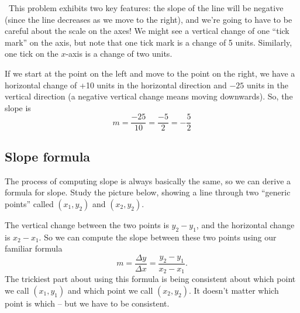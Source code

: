 \begin{boxex}
\exsoln\ This problem exhibits two key features: the slope of the line will be negative (since the line decreases as we move to the right), and we're going to have to be careful about the scale on the axes! We might see a vertical change of one ``tick mark'' on the axis, but note that one tick mark is a change of 5 units. Similarly, one tick on the $x$-axis is a change of two units.

If we start at the point on the left and move to the point on the right, we have a horizontal change of +10 units in the horizontal direction and $-25$ units in the vertical direction (a negative vertical change means moving downwards). So, the slope is \[m = \frac{-25}{10} = \frac{-5}{2} = -\frac{5}{2}\]
\end{boxex}

\subsection{Slope formula}

The process of computing slope is always basically the same, so we can derive a formula for slope. Study the picture below, showing a line through two ``generic points'' called $(x_1,y_2)$ and $(x_2,y_2)$.

\begin{center}
\end{center}

The vertical change between the two points is $y_2 - y_1$, and the horizontal change is $x_2 - x_1$. So we can compute the slope between these two points using our familiar formula \[m = \frac{\Delta y}{\Delta x} = \frac{y_2 - y_1}{x_2 - x_1}.\] The trickiest part about using this formula is being consistent about which point we call $(x_1, y_1)$ and which point we call $(x_2,y_2)$. It doesn't matter which point is which -- but we have to be consistent.

